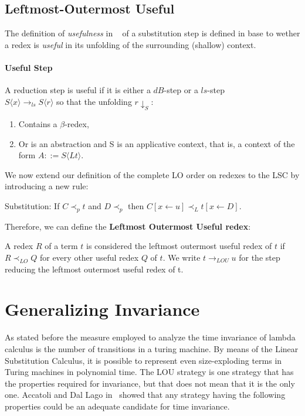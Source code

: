 \documentclass[12pt]{article}
\begin{document}
\subsection{Leftmost-Outermost Useful}\label{lou}
The definition of \textit{usefulness} in ~\cite{beta-invariance} of a substitution step is defined in base to wether a redex is \textit{useful} in its unfolding of the surrounding (shallow) context.
\paragraph{Useful Step} A reduction step is useful if it is either a $dB$-step or a $ls$-step \\ $S\langle x \rangle \rightarrow_{ls} S\langle r \rangle$ so that the unfolding $r \downarrow_S$:
\begin{enumerate}
  \item Contains a $\beta$-redex,
  \item Or is an abstraction and S is an applicative context, that is, a context of the form $A ::= S\langle Lt \rangle$.
\end{enumerate}
We now extend our definition of the complete LO order on redexes to the LSC by introducing a new rule:
\begin{center}
  Substitution: If $C \prec_p t$ and $D \prec_p$ then $C[x \leftarrow u] \prec_L t[x \leftarrow D]$.
\end{center}
Therefore, we can define the \textbf{Leftmost Outermost Useful redex}:
\begin{center}
  A redex $R$ of a term $t$ is considered the leftmost outermost useful redex of $t$ if $R \prec_{LO} Q$ for every other useful redex $Q$ of $t$. We write $t \rightarrow_{LOU} u$ for the step reducing the leftmost outermost useful redex of t.
\end{center}
\section{Generalizing Invariance}
As stated before the measure employed to analyze the time invariance of lambda calculus is the number of transitions in a turing machine. By means of the Linear Substitution Calculus, it is possible to represent even size-exploding terms in Turing machines in polynomial time. The LOU strategy is one strategy that has the properties required for invariance, but that does not mean that it is the only one. Accatoli and Dal Lago in~\cite{beta-invariance} showed that any strategy having the following properties could be an adequate candidate for time invariance.
\end{document}
